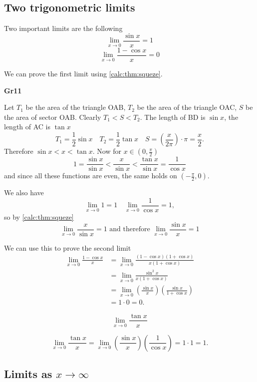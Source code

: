 \documentclass[10pt, a4paper]{article}
\begin{document}
\subsection{Two trigonometric limits}
Two important limits are the following
\[
\lim_{x \rightarrow 0}\frac{\sin x}{x} = 1
\]
\[
\lim_{x \rightarrow 0}\frac{1 - \cos x}{x} = 0
\]

We can prove the first limit using \autoref{calc:thm:squeze}.

\textbf{Gr11}

Let $T_1$ be the area of the triangle OAB, $T_2$ be the area of the triangle OAC, $S$ be the area of sector OAB. Clearly $T_1 < S < T_2$. The length of BD is $\sin x$, the length of AC is $\tan x$
\[
T_1 = \frac{1}{2}\sin x\quad T_2 = \frac{1}{2}\tan x\quad S = \left(\frac{x}{2\pi}\right) \cdot \pi = \frac{x}{2}.
\]
Therefore $\sin x < x < \tan x$. Now for $x \in \left(0, \frac{\pi}{2}\right)$
\[
1 = \frac{\sin x}{\sin x} < \frac{x}{\sin x} < \frac{\tan x}{\sin x} = \frac{1}{\cos x}
\]
and since all these functions are even, the same holds on $\left(-\frac{\pi}{2}, 0\right)$.

We also have
\[
\lim_{x \rightarrow 0} 1 = 1\quad\lim_{x \rightarrow 0}\frac{1}{\cos x} = 1,
\]
so by \autoref{calc:thm:squeze}
\[
\lim_{x \rightarrow 0}\frac{x}{\sin x} = 1\text{ and therefore } \lim_{x \rightarrow 0}\frac{\sin x}{x} = 1
\]

We can use this to prove the second limit
\begin{align*}
\lim_{x \rightarrow 0}\frac{1 - \cos x}{x} &= \lim_{x \rightarrow 0}\frac{(1 - \cos x)(1 + \cos x)}{x(1 + \cos x)} \\ 
&= \lim_{x \rightarrow 0}\frac{\sin ^ 2 x}{x(1 + \cos x)} \\
&= \lim_{x \rightarrow 0}\left(\frac{\sin x}{x}\right)\left(\frac{\sin x}{1 + \cos x}\right) \\
&= 1 \cdot 0 = 0.
\end{align*}

\begin{example}
    \[
    \lim_{x \rightarrow 0}\frac{\tan x}{x}
    \]

    \[
    \lim_{x \rightarrow 0}\frac{\tan x}{x} = \lim_{x \rightarrow 0} \left(\frac{\sin x}{x}\right) \left(\frac{1}{\cos x}\right) = 1 \cdot 1 = 1.
    \]
\end{example}


\subsection{Limits as \texorpdfstring{$x \rightarrow \infty$}{x tends to infinity}}
\end{document}
